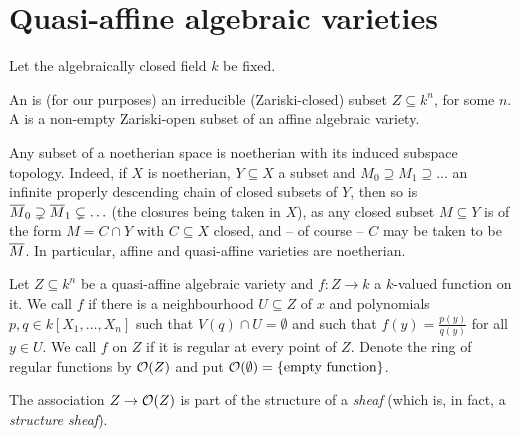 \documentclass[a4paper,parskip=half,numbers=enddot, DIV=12]{scrreprt}
\begin{document}
	\section{Quasi-affine algebraic varieties}
	Let the algebraically closed field $k$ be fixed.
	\begin{defi}
		An  is (for our purposes) an irreducible (Zariski-closed) subset $Z\subseteq k^n$, for some $n$. A  is a non-empty Zariski-open subset of an affine algebraic variety.
	\end{defi}
	\begin{rem}
		Any subset of a noetherian space is noetherian with its induced subspace topology. Indeed, if $X$ is noetherian, $Y\subseteq X$ a subset and $M_0\supseteq M_1\supseteq \ldots$ an infinite properly descending chain of closed subsets of $Y$, then so is $\overline M_0\supsetneq\overline M_1\subsetneq\ldots$ (the closures being taken in $X$), as any closed subset $M\subseteq Y$ is of the form $M=C\cap Y$ with $C\subseteq X$ closed, and -- of course -- $C$ may be taken to be $\overline M$. In particular, affine and quasi-affine varieties are noetherian.
	\end{rem}
	\begin{defi}
		Let $Z\subseteq k^n$ be a quasi-affine algebraic variety and $f: Z\to k$ a $k$-valued function on it. We call $f$  if there is a neighbourhood $U\subseteq Z$ of $x$ and polynomials $p,q\in k[X_1,\ldots,X_n]$ such that $V(q) \cap U = \emptyset$ and such that $f(y) = \frac{p(y)}{q(y)}$ for all $y\in U$. We call $f$  on $Z$ if it is regular at every point of $Z$. Denote the ring of regular functions by $\mathcal{O}(Z)$ and put $\mathcal{O}(\emptyset)=\{\text{empty function}\}$.
	\end{defi}
	The association $Z\to \mathcal{O}(Z)$ is part of the structure of a \emph{sheaf} (which is, in fact, a \emph{structure sheaf}).
\end{document}
